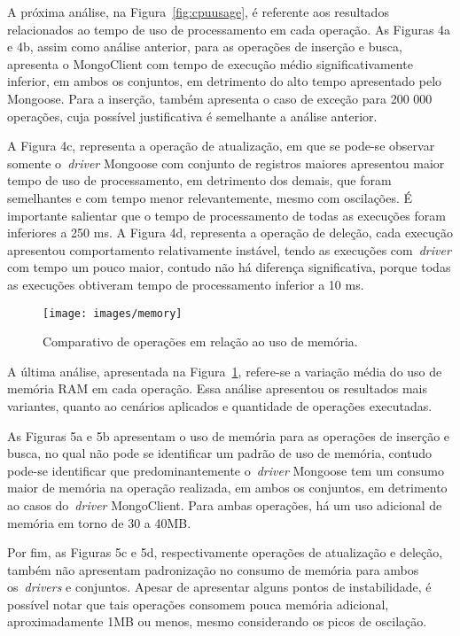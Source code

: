 \documentclass[12pt]{article}
\begin{document}
A próxima análise, na Figura~\ref{fig:cpuusage}, é referente aos resultados relacionados ao tempo de uso de processamento em cada operação.
As Figuras 4a e 4b, assim como análise anterior, para as operações de inserção e busca, apresenta o MongoClient com tempo de execução médio significativamente inferior, em ambos os conjuntos, em detrimento do alto tempo apresentado pelo Mongoose.
Para a inserção, também apresenta o caso de exceção para 200 000 operações, cuja possível justificativa é semelhante a análise anterior.

A Figura 4c, representa a operação de atualização, em que se pode-se observar somente o~\emph{driver} Mongoose com conjunto de registros maiores apresentou maior tempo de uso de processamento, em detrimento dos demais, que foram semelhantes e com tempo menor relevantemente, mesmo com oscilações. 
É importante salientar que o tempo de processamento de todas as execuções foram inferiores a 250 ms.
A Figura 4d, representa a operação de deleção, cada execução apresentou comportamento relativamente instável, tendo as execuções com~\emph{driver} com tempo um pouco maior, contudo não há diferença significativa, porque todas as execuções obtiveram tempo de processamento inferior a 10 ms.

\begin{figure}[!ht]
    \centering
    \texttt{[image: images/memory]}
    \caption{Comparativo de operações em relação ao uso de memória.}
    \label{fig:memory}
\end{figure}

A última análise, apresentada na Figura~\ref{fig:memory}, refere-se a variação média do uso de memória RAM em cada operação. 
Essa análise apresentou os resultados mais variantes, quanto ao cenários aplicados e quantidade de operações executadas.

As Figuras 5a e 5b apresentam o uso de memória para as operações de inserção e busca, no qual não pode se identificar um padrão de uso de memória, contudo pode-se identificar que predominantemente o~\emph{driver} Mongoose tem um consumo maior de memória na operação realizada, em ambos os conjuntos, em detrimento ao casos do~\emph{driver} MongoClient.
Para ambas operações, há um uso adicional de memória em torno de 30 a 40MB.

Por fim, as Figuras 5c e 5d, respectivamente operações de atualização e deleção, também não apresentam padronização no consumo de memória para ambos os~\emph{drivers} e conjuntos. 
Apesar de apresentar alguns pontos de instabilidade, é possível notar que tais operações consomem pouca memória adicional, aproximadamente 1MB ou menos, mesmo considerando os picos de oscilação.
\end{document}

